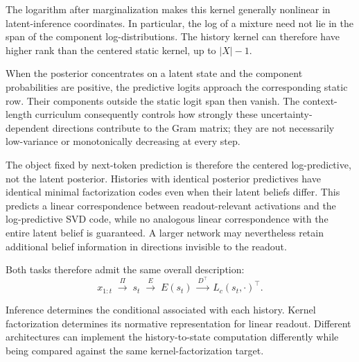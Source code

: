 The logarithm after marginalization makes this kernel generally nonlinear in latent-inference coordinates. In particular, the log of a mixture need not lie in the span of the component log-distributions. The history kernel can therefore have higher rank than the centered static kernel, up to $|X|-1$.

When the posterior concentrates on a latent state and the component probabilities are positive, the predictive logits approach the corresponding static row. Their components outside the static logit span then vanish. The context-length curriculum consequently controls how strongly these uncertainty-dependent directions contribute to the Gram matrix; they are not necessarily low-variance or monotonically decreasing at every step.

The object fixed by next-token prediction is therefore the centered log-predictive, not the latent posterior. Histories with identical posterior predictives have identical minimal factorization codes even when their latent beliefs differ. This predicts a linear correspondence between readout-relevant activations and the log-predictive SVD code, while no analogous linear correspondence with the entire latent belief is guaranteed. A larger network may nevertheless retain additional belief information in directions invisible to the readout.

Both tasks therefore admit the same overall description:
\[
x_{1:t}
\;\xrightarrow{\Pi}\;
s_t
\;\xrightarrow{E}\;
E(s_t)
\;\xrightarrow{D^\top}\;
L_c(s_t,\cdot)^\top.
\]

Inference determines the conditional associated with each history. Kernel factorization determines its normative representation for linear readout. Different architectures can implement the history-to-state computation differently while being compared against the same kernel-factorization target.